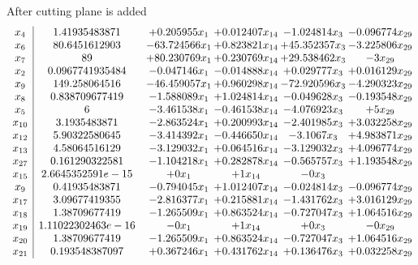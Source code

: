 \documentclass[11pt]{article}
\begin{document}
 After cutting plane is added 
\[\begin{array}{c| c c@{\hskip 2pt} c@{\hskip 2pt} c@{\hskip 2pt} c@{\hskip 2pt} }
 x_{4}   &  1.41935483871 & + 0.205955 x_{1} & + 0.012407 x_{14} & -1.024814 x_{3} & -0.096774 x_{29}\\
 x_{6}   &  80.6451612903 & -63.724566 x_{1} & + 0.823821 x_{14} & + 45.352357 x_{3} & -3.225806 x_{29}\\
 x_{7}   &  89 & + 80.230769 x_{1} & + 0.230769 x_{14} & + 29.538462 x_{3} & -3 x_{29}\\
 x_{2}   &  0.0967741935484 & -0.047146 x_{1} & -0.014888 x_{14} & + 0.029777 x_{3} & + 0.016129 x_{29}\\
 x_{9}   &  149.258064516 & -46.459057 x_{1} & + 0.960298 x_{14} & -72.920596 x_{3} & -4.290323 x_{29}\\
 x_{8}   &  0.838709677419 & -1.588089 x_{1} & + 1.024814 x_{14} & -0.049628 x_{3} & -0.193548 x_{29}\\
 x_{5}   &  6 & -3.461538 x_{1} & -0.461538 x_{14} & -4.076923 x_{3} & + 5 x_{29}\\
 x_{10}   &  3.1935483871 & -2.863524 x_{1} & + 0.200993 x_{14} & -2.401985 x_{3} & + 3.032258 x_{29}\\
 x_{12}   &  5.90322580645 & -3.414392 x_{1} & -0.446650 x_{14} & -3.1067 x_{3} & + 4.983871 x_{29}\\
 x_{13}   &  4.58064516129 & -3.129032 x_{1} & + 0.064516 x_{14} & -3.129032 x_{3} & + 4.096774 x_{29}\\
 x_{27}   &  0.161290322581 & -1.104218 x_{1} & + 0.282878 x_{14} & -0.565757 x_{3} & + 1.193548 x_{29}\\
 x_{15}   &  2.6645352591e-15 & + 0 x_{1} & + 1 x_{14} & -0 x_{3} &   \\
 x_{9}   &  0.41935483871 & -0.794045 x_{1} & + 1.012407 x_{14} & -0.024814 x_{3} & -0.096774 x_{29}\\
 x_{17}   &  3.09677419355 & -2.816377 x_{1} & + 0.215881 x_{14} & -1.431762 x_{3} & + 3.016129 x_{29}\\
 x_{18}   &  1.38709677419 & -1.265509 x_{1} & + 0.863524 x_{14} & -0.727047 x_{3} & + 1.064516 x_{29}\\
 x_{19}   &  1.11022302463e-16 & -0 x_{1} & + 1 x_{14} & + 0 x_{3} & -0 x_{29}\\
 x_{20}   &  1.38709677419 & -1.265509 x_{1} & + 0.863524 x_{14} & -0.727047 x_{3} & + 1.064516 x_{29}\\
 x_{21}   &  0.193548387097 & + 0.367246 x_{1} & + 0.431762 x_{14} & + 0.136476 x_{3} & + 0.032258 x_{29}\\

\end{array}\]
\end{document}
